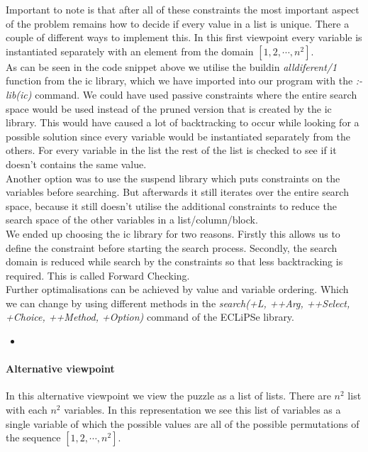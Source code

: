 Important to note is that after all of these constraints the most important aspect of the problem remains how to decide if every value in a list is unique. 
There a couple of different ways to implement this.
In this first viewpoint every variable is instantiated separately with an element from the domain $[1,2,\cdots,n^{2}]$. \\

As can be seen in the code snippet above we utilise the buildin \textsl{alldiferent/1} function from the ic library, which we have imported into our program with the \textsl{:- lib(ic)} command.
We could have used passive constraints where the entire search space would be used instead of the pruned version that is created by the ic library.
This would have caused a lot of backtracking to occur while looking for a possible solution since every variable would be instantiated separately from the others.
For every variable in the list the rest of the list is checked to see if it doesn't contains the same value.\\

Another option was to use the suspend library which puts constraints on the variables before searching.
But afterwards it still iterates over the entire search space, because it still doesn't utilise the additional constraints to reduce the search space of the other variables in a list/column/block.\\

We ended up choosing the ic library for two reasons.
Firstly this allows us to define the constraint before starting the search process.
Secondly, the search domain is reduced while search by the constraints so that less backtracking is required.
This is called Forward Checking. \\

Further optimalisations can be achieved by value and variable ordering.
Which we can change by using different methods in the \textsl{search(+L, ++Arg, ++Select, +Choice, ++Method, +Option)} command of the ECLiPSe library.
\begin{itemize}
\item %
\end{itemize}

\paragraph*{Alternative viewpoint}

In this alternative viewpoint we view the puzzle as a list of lists.
There are $n^2$ list with each $n^{2}$ variables.
In this representation we see this list of variables as a single variable of which the possible values are all of the possible permutations of the sequence $[1,2,\cdots,n^{2}]$. \\

